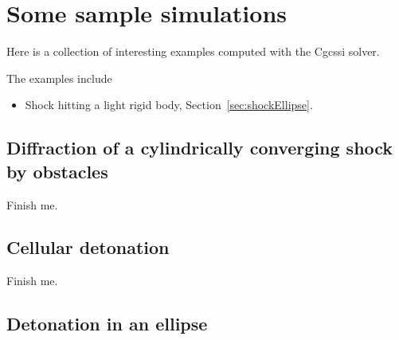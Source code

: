  \newcommand{\Gc}{{\mathcal G}}

\section{Some sample simulations} \label{sec:sampleSimulations}

Here is a collection of interesting examples computed with the Cgcssi solver.

The examples include
\begin{itemize}
   \item Shock hitting a light rigid body, Section~\ref{sec:shockEllipse}.
\end{itemize}



\subsection{Diffraction of a cylindrically converging shock by obstacles}\label{sec:cylindricalShock}

  Finish me.


\subsection{Cellular detonation}\label{sec:cellularDetonation}

  Finish me.


\subsection{Detonation in an ellipse}\label{sec:detonationEllipse}

